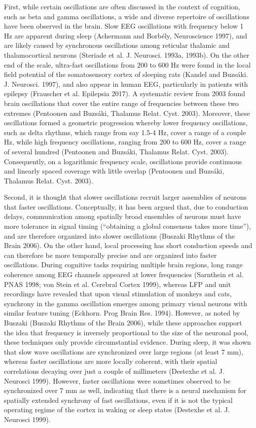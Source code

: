 First, while certain oscillations are often discussed in the context of cognition, such as beta and gamma oscillations, a wide and diverse repertoire of oscillations have been observed in the brain. Slow EEG oscillations with frequency below 1 Hz are apparent during sleep (Achermann and Borbély, Neuroscience 1997), and are likely caused by synchronous oscillations among reticular thalamic and thalamocortical neurons (Steriade et al. J. Neurosci. 1993a, 1993b). On the other end of the scale, ultra-fast oscillations from 200 to 600 Hz were found in the local field potential of the somatosensory cortex of sleeping rats (Kandel and Buzsáki. J. Neurosci. 1997), and also appear in human EEG, particularly in patients with epilepsy (Frauscher et al. Epilepsia 2017). A systematic review from 2003 found brain oscillations that cover the entire range of frequencies between these two extremes (Pentoonen and Buzsáki, Thalamus Relat. Cyst. 2003). Moreover, these oscillations formed a geometric progression whereby lower frequency oscillations, such as delta rhythms, which range from say 1.5-4 Hz, cover a range of a couple Hz, while high frequency oscillations, ranging from 200 to 600 Hz, cover a range of several hundred (Pentoonen and Buzsáki, Thalamus Relat. Cyst. 2003). Consequently, on a logarithmic frequency scale, oscillations provide continuous and linearly spaced coverage with little overlap (Pentoonen and Buzsáki, Thalamus Relat. Cyst. 2003). 

Second, it is thought that slower oscillations recruit larger assemblies of neurons that faster oscillations. Conceptually, it has been argued that, due to conduction delays, communication among spatially broad ensembles of neurons must have more tolerance in signal timing (“obtaining a global consensus takes more time”), and are therefore organized into slower oscillations (Buszaki Rhythms of the Brain 2006). On the other hand, local processing has short conduction speeds and can therefore be more temporally precise and are organized into faster oscillations. During cognitive tasks requiring multiple brain regions, long range coherence among EEG channels appeared at lower frequencies (Sarnthein et al. PNAS 1998; von Stein et al. Cerebral Cortex 1999), whereas LFP and unit recordings have revealed that upon visual stimulation of monkeys and cats, synchrony in the gamma oscillation emerges among primary visual neurons with similar feature tuning (Eckhorn. Prog Brain Res. 1994). However, as noted by Buszaki  (Buszaki Rhythms of the Brain 2006), while these approaches support the idea that frequency is inversely proportional to the size of the neuronal pool, these techniques only provide circumstantial evidence. During sleep, it was shown that slow wave oscillations are synchronized over large regions (at least 7 mm), whereas faster oscillations are more locally coherent, with their spatial correlations decaying over just a couple of millimeters (Destexhe et al. J. Neurosci 1999). However, faster oscillations were sometimes observed to be synchronized over 7 mm as well, indicating that there is a neural mechanism for spatially extended synchrony of fast oscillations, even if it is not the typical operating regime of the cortex in waking or sleep states (Destexhe et al. J. Neurosci 1999).


